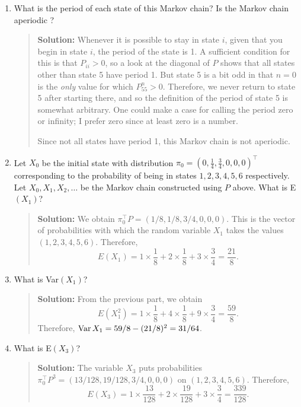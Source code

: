 \documentclass{article}
\def\Var{\mbox{Var\,}}
\begin{document}
\begin{enumerate}
\begin{enumerate}
    \item What is the period of each state of this Markov chain? Is the Markov
    chain aperiodic ?
    \begin{quotation}{\bf Solution:}
    Whenever it is possible to stay in state $i$, given that you begin in state $i$, 
    the period of the state is 1.  A sufficient condition for this is that $P_{ii}>0$, so
    a look at the diagonal of $P$ shows that all states other than state 5 have period 1.
    But state 5 is a bit odd in that $n=0$ is the {\em only} value for which $P_{55}^n>0$.
    Therefore, we never return to state 5 after starting there, and so the definition of 
    the period of state 5 is somewhat arbitrary.  One could make a case for calling the period
    zero or infinity; I prefer zero since at least zero is a number.

    Since not all states have period 1, this Markov chain is not aperiodic.
    \end{quotation}
    
    \item\label{initial} Let $X_0$ be the initial state with distribution
    $\pi_0 = (0, \frac{1}{4}, \frac{3}{4}, 0, 0, 0)^\top$
    corresponding to the probability of being in states $ 1, 2, 3, 4, 5, 6$
    respectively. Let $X_0, X_1, X_2,\dots$ be the Markov chain constructed
    using $P$ above. What is E$(X_1)$?
    \begin{quotation}{\bf Solution:}
    We obtain $\pi_0^\top P=(1/8, 1/8, 3/4, 0,0,0)$.  This is the vector of probabilities with
    which the random variable $X_1$ takes the values $(1, 2, 3, 4, 5, 6)$.
    Therefore, 
    \[
    E(X_1) = 1\times \frac18 + 2\times \frac18 + 3\times \frac34 = \frac{21}{8}.
    \]
    \end{quotation}

    \item What is Var$(X_1)$?
    \begin{quotation}{\bf Solution:}
    From the previous part, we obtain
    \[
    E(X_1^2) = 1\times \frac18 + 4\times \frac18 + 9\times \frac34 = \frac{59}{8}.    
    \]
    Therefore, $\Var X_1= 59/8 - (21/8)^2 = 31/64$.
    \end{quotation}

    \item What is E$(X_3)$? 
    \begin{quotation}{\bf Solution:}
    The variable $X_3$ puts probabilities $\pi_0^\top P^3=
    (13/128, 19/128, 3/4, 0, 0, 0)$ on $(1, 2, 3, 4, 5, 6)$.  Therefore,
    \[
    E(X_3) = 1\times \frac{13}{128} + 2\times \frac{19}{128} 
    + 3\times \frac34 = \frac{339}{128}.    
    \]
    \end{quotation}


\end{enumerate}
\end{enumerate}
\end{document}
